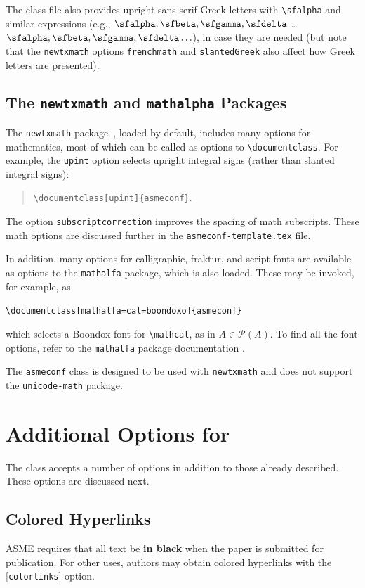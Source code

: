 \documentclass[captionpatch,colorlinks,upint,subscriptcorrection,varvw,german]{asmeconf}
\begin{document}
The class file also provides upright sans-serif Greek letters with \verb|\sfalpha| and similar expressions (e.g., $\sfalpha, \sfbeta, \sfgamma, \sfdelta$ \ldots $\bm{\sfalpha, \sfbeta, \sfgamma, \sfdelta \ldots}$), in case they are needed (but note that the \verb|newtxmath| options \verb|frenchmath| and \verb|slantedGreek| also affect how Greek letters are presented).

\subsection{The \texttt{newtxmath} and \texttt{mathalpha} Packages~\cite{sharpe1,sharpe2}} The \texttt{newtxmath} package~\cite{sharpe1}, loaded by default, includes many options for mathematics, most of which can be called as options to \verb|\documentclass|. For example, the \texttt{upint} option selects upright integral signs (rather than slanted integral signs):
\begin{quote}
\verb|\documentclass[upint]{asmeconf}|. 
\end{quote}  
The option \verb|subscriptcorrection| improves the spacing of math subscripts. These math options are discussed further in the \texttt{asmeconf-template.tex} file. 

In addition, many options for calligraphic, fraktur, and script fonts are available as options to the \texttt{mathalfa} package, which is also loaded. These may be invoked, for example, as 
\begin{center}
\verb|\documentclass[mathalfa=cal=boondoxo]{asmeconf}| 
\end{center}
which selects a Boondox font for \verb|\mathcal|, as in $A \in \mathcal{P}(A)$. To find all the font options, refer to the \texttt{mathalfa} package documentation \cite{sharpe2}.

The \texttt{asmeconf} class is designed to be used with \texttt{newtxmath} and does not support the \texttt{unicode-math} package.



\section{Additional Options for }
The class accepts a number of options in addition to those already described. These options are discussed next.

\subsection{Colored Hyperlinks}
ASME requires that all text be \textbf{in black} when the paper is submitted for publication.  For other uses, authors may
obtain colored hyperlinks with the [\texttt{colorlinks}] option.
\end{document}
